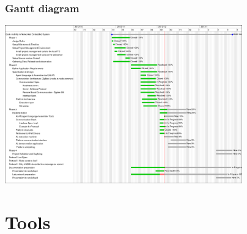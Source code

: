 \documentclass{beamer}
\theoremstyle{definition} \newtheorem{mdefinition}{Definition}
\theoremstyle{plain} \newtheorem{mtheorem}{Theorem}
\theoremstyle{plain} \newtheorem{mcorollary}{Corollary}
\theoremstyle{plain} \newtheorem{mfact}{Fact}
\begin{document}
\begin{frame}
	\frametitle{Gantt diagram}

\begin{center}
\includegraphics[height=2.7in]{img/gantt}

\end{center}
\end{frame}

\section{Tools}
\end{document}
